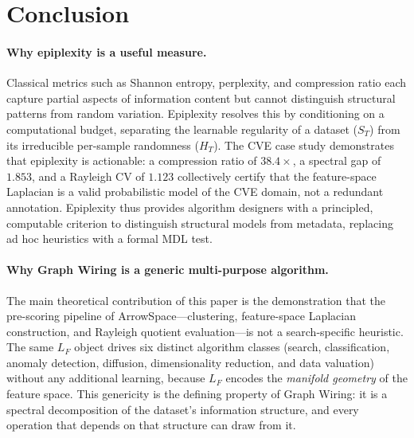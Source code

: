\documentclass[12pt,a4paper]{article}
\theoremstyle{plain}
\theoremstyle{definition}
\theoremstyle{remark}
\newcommand{\1}{\mathbf{1}}
\begin{document}
	\section{Conclusion}
	\label{sec:conclusion}
	
	\paragraph{Why epiplexity is a useful measure.}
	Classical metrics such as Shannon entropy, perplexity, and compression
	ratio each capture partial aspects of information content but cannot
	distinguish structural patterns from random variation.
	Epiplexity \citep{finzi2026epiplexity} resolves this by conditioning
	on a computational budget, separating the learnable regularity of a
	dataset ($S_T$) from its irreducible per-sample randomness ($H_T$).
	The CVE case study demonstrates that epiplexity is actionable: a
	compression ratio of $38.4\times$, a spectral gap of $1.853$, and a
	Rayleigh CV of $1.123$ collectively certify that the feature-space
	Laplacian is a valid probabilistic model of the CVE domain, not a
	redundant annotation.
	Epiplexity thus provides algorithm designers with a principled, computable
	criterion to distinguish structural models from metadata, replacing
	ad hoc heuristics with a formal MDL test.
	
	\paragraph{Why Graph Wiring is a generic multi-purpose algorithm.}
	The main theoretical contribution of this paper is the demonstration that
	the pre-scoring pipeline of ArrowSpace---clustering, feature-space
	Laplacian construction, and Rayleigh quotient evaluation---is not a
	search-specific heuristic.
	The same $L_F$ object drives six distinct algorithm classes
	(search, classification, anomaly detection, diffusion, dimensionality
	reduction, and data valuation) without any additional learning, because
	$L_F$ encodes the \emph{manifold geometry} of the feature space.
	This genericity is the defining property of Graph Wiring: it is a
	spectral decomposition of the dataset's information structure, and
	every operation that depends on that structure can draw from it.
	
\end{document}
